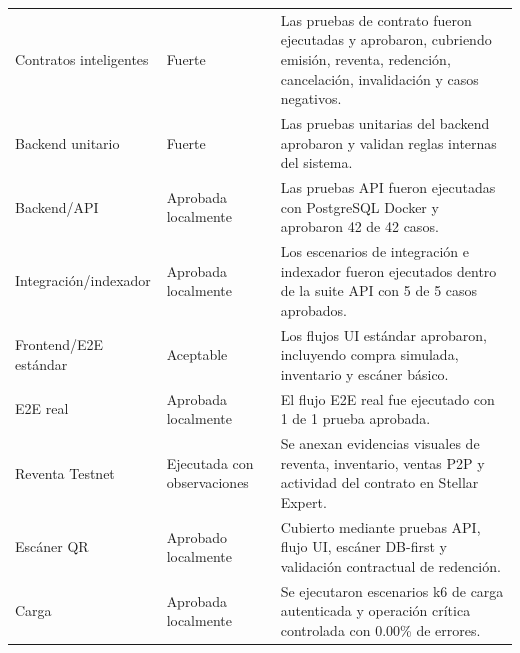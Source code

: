 \documentclass[12pt,letterpaper]{article}
\begin{document}
\begin{table}[H]
\centering
\begingroup
\scriptsize
\setlength{\tabcolsep}{3pt}
\renewcommand{\arraystretch}{1.22}

\begin{tabularx}{\textwidth}{|
>{\raggedright\arraybackslash}p{3.5cm}|
>{\raggedright\arraybackslash}p{3.8cm}|
>{\raggedright\arraybackslash}X|}
\hline
\multicolumn{1}{|>{\centering\arraybackslash}m{3.5cm}|}{\textbf{Categoría}} &
\multicolumn{1}{>{\centering\arraybackslash}m{3.8cm}|}{\textbf{Estado de cobertura}} &
\multicolumn{1}{>{\centering\arraybackslash}m{7.0cm}|}{\textbf{Análisis}} \\
\hline

Contratos inteligentes &
Fuerte &
Las pruebas de contrato fueron ejecutadas y aprobaron, cubriendo emisión, reventa, redención, cancelación, invalidación y casos negativos. \\
\hline

Backend unitario &
Fuerte &
Las pruebas unitarias del backend aprobaron y validan reglas internas del sistema. \\
\hline

Backend/API &
Aprobada localmente &
Las pruebas API fueron ejecutadas con PostgreSQL Docker y aprobaron 42 de 42 casos. \\
\hline

Integración/indexador &
Aprobada localmente &
Los escenarios de integración e indexador fueron ejecutados dentro de la suite API con 5 de 5 casos aprobados. \\
\hline

Frontend/E2E estándar &
Aceptable &
Los flujos UI estándar aprobaron, incluyendo compra simulada, inventario y escáner básico. \\
\hline

E2E real &
Aprobada localmente &
El flujo E2E real fue ejecutado con 1 de 1 prueba aprobada. \\
\hline

Reventa Testnet &
Ejecutada con observaciones &
Se anexan evidencias visuales de reventa, inventario, ventas P2P y actividad del contrato en Stellar Expert. \\
\hline

Escáner QR &
Aprobado localmente &
Cubierto mediante pruebas API, flujo UI, escáner DB-first y validación contractual de redención. \\
\hline

Carga &
Aprobada localmente &
Se ejecutaron escenarios k6 de carga autenticada y operación crítica controlada con 0.00\% de errores. \\
\hline


\end{tabularx}
\end{table}
\end{document}
